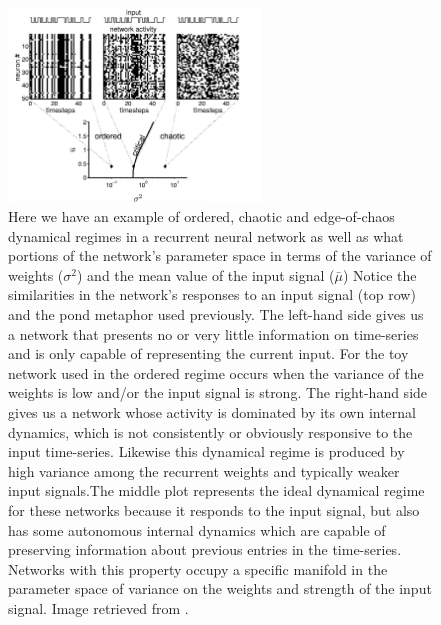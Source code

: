 \begin{figure}[h]
\centering
\includegraphics[width=0.6\textwidth]{images/EdgeOfChaos.png}
\caption[Nils Bertschinger and Thomas Natchl\"ager]{Here we have an example of ordered, chaotic and edge-of-chaos dynamical regimes in a recurrent neural network as well as what portions of the network's parameter space in terms of the variance of weights ($\sigma^2$) and the mean value of the input signal ($\bar{\mu}$) Notice the similarities in the network's responses to an input signal (top row) and the pond metaphor used previously. The left-hand side gives us a network that presents no or very little information on time-series and is only capable of representing the current input. For the toy network used in \cite{bertschinger2004real} the ordered regime occurs when the variance of the weights is low and/or the input signal is strong. The right-hand side gives us a network whose activity is dominated by its own internal dynamics, which is not consistently or obviously responsive to the input time-series. Likewise this dynamical regime is produced by high variance among the recurrent weights  and typically weaker input signals.The middle plot represents the ideal dynamical regime for these networks because it responds to the input signal, but also has some autonomous internal dynamics which are capable of preserving information about previous entries in the time-series. Networks with this property occupy a specific manifold in the parameter space of variance on the weights and strength of the input signal. Image retrieved from \cite{bertschinger2004real}.}
\label{F:edgechaos}
\end{figure}

